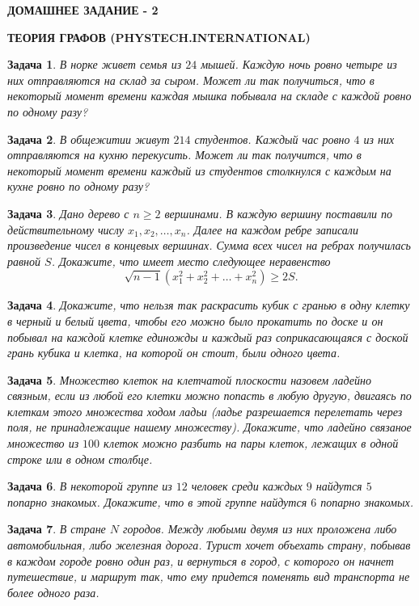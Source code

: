 \documentclass[12pt,a4paper,fleqn]{article}
\newtheorem{exersize}{Задача}
\begin{document}
\begin{center}
	\bf \Large ДОМАШНЕЕ ЗАДАНИЕ - 2
	
	\bf \Large ТЕОРИЯ ГРАФОВ (PHYSTECH.INTERNATIONAL)
\end{center}

\setcounter{exersize}{20}

\begin{exersize}
	В норке живет семья из $24$ мышей. Каждую ночь ровно четыре из них отправляются на склад за сыром. 
	Может ли так получиться, что в некоторый момент времени каждая мышка побывала на складе с каждой ровно по одному разу?
\end{exersize}

\begin{exersize}
	В общежитии живут $214$ студентов. Каждый час ровно $4$ из них отправляются на кухню перекусить. 
	Может ли так получится, что в некоторый момент времени каждый из студентов столкнулся с каждым на кухне ровно по одному разу?
\end{exersize}
	
\begin{exersize}
	Дано дерево с $n \geqslant 2$ вершинами. В каждую вершину поставили по действительному числу $x_1, x_2, \dots, x_n$. Далее на каждом ребре записали произведение чисел в концевых вершинах. Сумма всех чисел на ребрах получилась равной $S$. Докажите, что имеет место следующее неравенство $$\sqrt{n-1} (x_1^2 + x_2^2 + \dots + x_n^2) \geqslant 2S.$$
\end{exersize}	

\begin{exersize}
	Докажите, что нельзя так раскрасить кубик с гранью в одну клетку в черный и белый цвета, чтобы его можно было прокатить по доске и он побывал на каждой клетке единожды и каждый раз соприкасающаяся с доской грань кубика и клетка, на которой он стоит, были одного цвета.
\end{exersize}	

\begin{exersize}
	Множество клеток на клетчатой плоскости назовем \emph{ладейно связным}, если из любой его клетки можно попасть в любую другую, 
	двигаясь по клеткам этого множества ходом ладьи (ладье разрешается перелетать через поля, не принадлежащие нашему множеству). 
	Докажите, что ладейно связаное множество из $100$ клеток можно разбить на пары клеток, лежащих в одной строке или в одном столбце.
\end{exersize}	

\begin{exersize}
	В некоторой группе из $12$ человек среди каждых $9$ найдутся $5$ попарно знакомых. Докажите, что в этой группе найдутся $6$ попарно знакомых.
\end{exersize}	 

\begin{exersize}
	В стране $N$ городов. Между любыми двумя из них проложена либо автомобильная, либо железная дорога. Турист хочет объехать страну, побывав в каждом городе ровно один раз, и вернуться в город, с которого он начнет путешествие, и маршрут так, что ему придется поменять вид транспорта не более одного раза.
\end{exersize}	 
\end{document}
